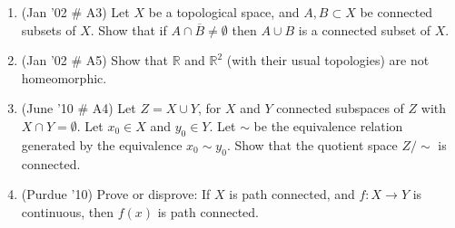 \documentclass[psamsfonts, 11pt, reqno]{amsart}
\begin{document}
\begin{enumerate}
\vfill

\item (Jan '02 \# A3) Let $X$ be a topological space, and $A,B \subset X$ be connected subsets of $X$.  Show that if $A \cap \overline{B}
\neq \emptyset$ then $A \cup B$ is a connected subset of $X$.

\vfill

\item (Jan '02 \# A5) Show that $\mathbb{R}$ and $\mathbb{R}^2$ (with their usual topologies) are not homeomorphic.

\vfill

\item (June '10 \# A4) Let $Z = X \cup Y$, for $X$ and $Y$ connected subspaces of $Z$ with $X \cap Y = \emptyset$.  Let
$x_0 \in X$ and $y_0 \in Y$.  Let $\sim$ be the equivalence relation generated by the equivalence $x_0 \sim y_0$.  Show
that the quotient space $Z/\sim$ is connected.

\vfill

\item (Purdue '10) Prove or disprove: If $X$ is path connected, and $f: X \rightarrow Y$ is continuous, then $f(x)$ is
path connected.

\vfill



\end{enumerate}
\end{document}
